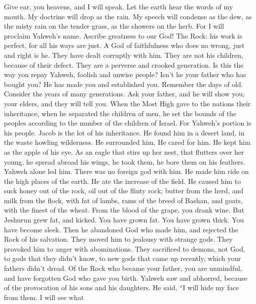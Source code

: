  Give ear, you heavens, and I will speak. Let the earth hear
the words of my mouth.  My doctrine will drop as the rain.
My speech will condense as the dew, as the misty rain on the tender
grass, as the showers on the herb.  For I will proclaim
Yahweh's name. Ascribe greatness to our God!  The Rock: his
work is perfect, for all his ways are just. A God of faithfulness who
does no wrong, just and right is he.  They have dealt
corruptly with him. They are not his children, because of their defect.
They are a perverse and crooked generation.  Is this the way
you repay Yahweh, foolish and unwise people? Isn't he your father who
has bought you? He has made you and established you. 
Remember the days of old. Consider the years of many generations. Ask
your father, and he will show you; your elders, and they will tell you.
 When the Most High gave to the nations their inheritance,
when he separated the children of men, he set the bounds of the peoples
according to the number of the children of Israel.  For
Yahweh's portion is his people. Jacob is the lot of his inheritance.
 He found him in a desert land, in the waste howling
wilderness. He surrounded him. He cared for him. He kept him as the
apple of his eye.  As an eagle that stirs up her nest, that
flutters over her young, he spread abroad his wings, he took them, he
bore them on his feathers.  Yahweh alone led him. There was
no foreign god with him.  He made him ride on the high
places of the earth. He ate the increase of the field. He caused him to
suck honey out of the rock, oil out of the flinty rock; 
butter from the herd, and milk from the flock, with fat of lambs, rams
of the breed of Bashan, and goats, with the finest of the wheat. From
the blood of the grape, you drank wine.  But Jeshurun grew
fat, and kicked. You have grown fat. You have grown thick. You have
become sleek. Then he abandoned God who made him, and rejected the Rock
of his salvation.  They moved him to jealousy with strange
gods. They provoked him to anger with abominations.  They
sacrificed to demons, not God, to gods that they didn't know, to new
gods that came up recently, which your fathers didn't dread.
 Of the Rock who became your father, you are unmindful, and
have forgotten God who gave you birth.  Yahweh saw and
abhorred, because of the provocation of his sons and his daughters.
 He said, ``I will hide my face from them. I will see what
